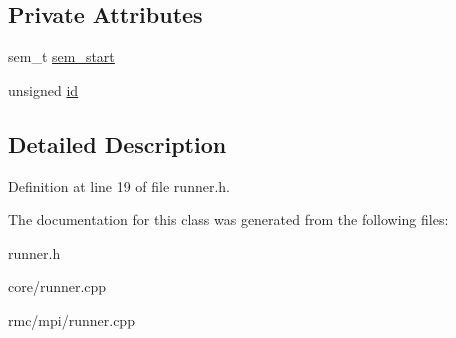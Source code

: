\subsection*{Private Attributes}
\begin{CompactItemize}
\item 
\hypertarget{classRunner_4b0827d5df2df632db4ab71dd55e81b2}{
sem\_\-t \hyperlink{classRunner_4b0827d5df2df632db4ab71dd55e81b2}{sem\_\-start}}
\label{classRunner_4b0827d5df2df632db4ab71dd55e81b2}

\item 
\hypertarget{classRunner_1989c1f8e0b0b54ad2e60a341007e59d}{
unsigned \hyperlink{classRunner_1989c1f8e0b0b54ad2e60a341007e59d}{id}}
\label{classRunner_1989c1f8e0b0b54ad2e60a341007e59d}

\end{CompactItemize}


\subsection{Detailed Description}




Definition at line 19 of file runner.h.

The documentation for this class was generated from the following files:\begin{CompactItemize}
\item 
runner.h\item 
core/runner.cpp\item 
rmc/mpi/runner.cpp\end{CompactItemize}
